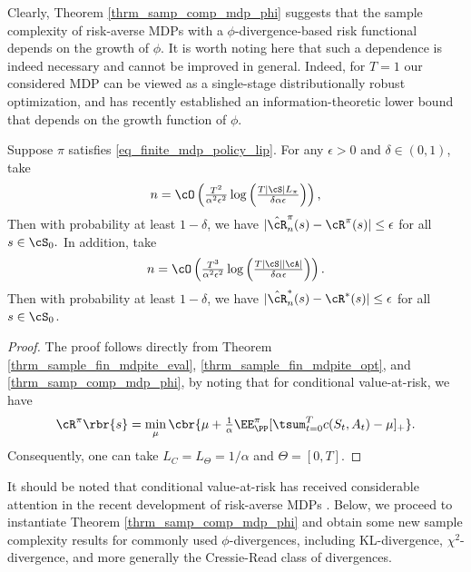 \documentclass[9pt]{article}
\numberwithin{equation}{section}
\renewcommand{\frac}[2]{\tfrac{#1}{#2}}
\begin{document}
Clearly, Theorem \ref{thrm_samp_comp_mdp_phi} suggests that the sample complexity of risk-averse MDPs with a $\phi$-divergence-based risk functional depends on the growth of  $\phi$. 
It is worth noting here that such a dependence is indeed necessary and cannot be improved in general.
Indeed, for $T=1$ our considered MDP can be viewed as a single-stage distributionally robust optimization, and \cite{li2026sample} has recently established an information-theoretic lower bound that depends on the growth function of $\phi$. 

\begin{corollary} \label{cor_samp_comp_mdp_cvar}
    Suppose $\pi$ satisfies \eqref{eq_finite_mdp_policy_lip}. For any $\epsilon > 0$ and $\delta \in (0,1)$, take
    \begin{align*}
    n = \cO \left(\tfrac{T^2}{\alpha^2\epsilon^2} \log \left(\tfrac{T |\cS| L_\pi}{\delta \alpha \epsilon} \right)\right), 
    \end{align*}
 Then with probability at least $1-\delta$, we have $|\hat{\cR}_n^\pi(s) - \cR^{\pi}(s)| \leq \epsilon$ for all $s \in \cS_0.$
    In addition, take
    \begin{align*}
    n = \cO \left(\tfrac{T^3}{\alpha^2 \epsilon^2} \log \left(\tfrac{T |\cS| |\cA|}{\delta \alpha \epsilon} \right)\right).
    \end{align*}
    Then with probability at least $1-\delta$, we have  $| \hat{\cR}^*_n(s)  -\cR^*(s) | \leq \epsilon $ for all $ s \in \cS_0$.
\end{corollary}
\begin{proof}
    The proof follows directly from Theorem \ref{thrm_sample_fin_mdpite_eval}, \ref{thrm_sample_fin_mdpite_opt}, and \ref{thrm_samp_comp_mdp_phi}, by noting that for conditional value-at-risk, we have \cite{shapiro2017distributionally}
    \begin{align*}
    \cR^\pi \rbr{ s} = \min_{\mu} \cbr{ \mu + \frac{1}{\alpha} \EE^\pi_{\PP} [{ \tsum_{t=0}^T c(S_t, A_t) - \mu}]_+ }.
    \end{align*}
   Consequently, one can take  
    $L_C = L_\Theta = 1/\alpha$ and $\Theta = [0,T]$.
\end{proof}

It should be noted that conditional value-at-risk has received considerable attention in the recent development of risk-averse MDPs \cite{bastani2022regret,wang2023near,ni2024risk}. 
Below, we proceed to instantiate Theorem \ref{thrm_samp_comp_mdp_phi} and obtain some new sample complexity results for commonly used $\phi$-divergences, 
including KL-divergence, $\chi^2$-divergence, and more generally 
the Cressie-Read class of divergences.
\end{document}
